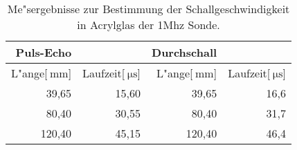 \begin{table}[!h]
\begin{center}
\begin{tabular}{|r|r|r|r|}
\hline
Puls-Echo & & Durchschall & \\
\hline
\hline
 L"ange[$\SI{}{\milli\meter}$] & Laufzeit[$\SI{}{\micro\second}$] & L"ange[$\SI{}{\milli\meter}$] & Laufzeit[$\SI{}{\micro\second}$]\\
\hline
\hline
 39,65 &	15,60 &	 39,65 &	16,6\\
 80,40 &	30,55 &	 80,40 &	31,7\\
120,40 &	45,15 &	120,40 &	46,4\\
\hline
\end{tabular}
\caption[]{Me"sergebnisse zur Bestimmung der Schallgeschwindigkeit in Acrylglas der 1Mhz Sonde.}
\label{a1}
\end{center}
\end{table}
